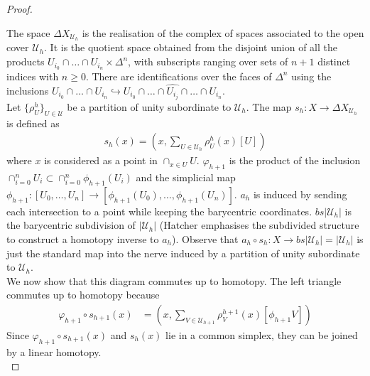 \documentclass[a4paper,11pt]{article}
\theoremstyle{definition}
\theoremstyle{plain}
\theoremstyle{remark}
\begin{document}
{\begin{proof}
\begin{figure}[H]
\center
{}
\end{figure}

The space $\Delta X_{\mathcal{U}_{h}}$ is the realisation of the complex of spaces associated to the open cover $\mathcal{U}_{h}$. It is the quotient space obtained from the disjoint union of all the products $U_{i_0}\cap \dots \cap U_{i_n} \times \Delta^n$, with subscripts ranging over sets of $n+1$ distinct indices with $n\geq 0$. There are identifications over the faces of $\Delta^n$ using the inclusions $U_{i_0}\cap \dots \cap U_{i_n} \hookrightarrow U_{i_0}\cap \dots \cap \widehat {U_{i_{j}}} \cap \dots \cap U_{i_n}$. \\

Let $\{\rho^{h}_{U}\}_{U\in \mathcal{U}}$ be a partition of unity subordinate to $\mathcal{U}_{h}$. The map $s_{h}: X\rightarrow \Delta X_{\mathcal{U}_{h}}$ is defined as
\begin{align*}
s_{h}(x) = (x,\sum_{U\in \mathcal{U}_{h}} \rho^{h}_{U}(x) [U])
\end{align*}
where $x$ is considered as a point in $\cap_{x\in U} U$. $\varphi_{h+1}$ is the product of the inclusion $\cap_{i=0}^{n} U_{i} \subset \cap_{i=0}^{n} \phi_{h+1}(U_{i})$ and the simplicial map $\phi_{h+1}:[U_{0},\dots,U_{n}] \rightarrow[\phi_{h+1}(U_{0}),\dots,\phi_{h+1}(U_{n})]$. $a_{h}$ is induced by sending each intersection to a point while keeping the barycentric coordinates. $bs|\mathcal{U}_{h}|$ is the barycentric subdivision of $|\mathcal{U}_{h}|$ (Hatcher emphasises the subdivided structure to construct a homotopy inverse to $a_{h}$). Observe that $a_{h}\circ s_{h}: X\rightarrow bs|\mathcal{U}_{h}|=|\mathcal{U}_{h}|$ is just the standard map into the nerve induced by a partition of unity subordinate to $\mathcal{U}_{h}$. \\

We now show that this diagram commutes up to homotopy. The left triangle commutes up to homotopy because 
\begin{align*}
\varphi_{h+1} \circ s_{h+1}(x) &= (x,\sum_{V\in \mathcal{U}_{h+1}} \rho^{h+1}_{V}(x) [\phi_{h+1} V])
\end{align*}
Since $\varphi_{h+1} \circ s_{h+1}(x)$ and $s_{h}(x)$ lie in a common simplex, they can be joined by a linear homotopy. \\


\end{proof}}
\end{document}
